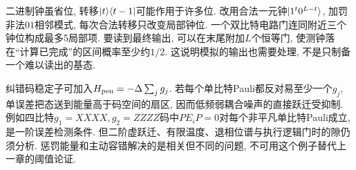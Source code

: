 二进制钟虽省位, 转移$\lvert t\rangle\langle t-1\rvert$可能作用于许多位. 改用合法一元钟$\lvert 1^t0^{L-t}\rangle$, 加罚非法$01$相邻模式, 每次合法转移只改变局部钟位. 一个双比特电路门连同附近三个钟位构成最多5局部项. 要读到最终输出, 可以在末尾附加$L$个恒等门, 使测钟落在“计算已完成”的区间概率至少约$1/2$. 这说明模拟的输出也需要处理, 不是只制备一个难以读出的基态.

纠错码稳定子可加入$H_{\rm pen}=-\Delta\sum_jg_j$. 若每个单比特Pauli都反对易至少一个$g_j$, 单误差把态送到能量高于码空间的扇区, 因而低频弱耦合噪声的直接跃迁受抑制. 例如四比特$g_1=XXXX,g_2=ZZZZ$码中$P E_iP=0$对每个非平凡单比特Pauli成立, 是一阶误差检测条件. 但二阶虚跃迁、有限温度、退相位谱与执行逻辑门时的隙仍须分析. 惩罚能量和主动容错解决的是相关但不同的问题, 不可用这个例子替代上一章的阈值论证.
